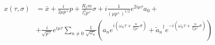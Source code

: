 \begin{equation}
\begin{aligned}
x(\tau,\sigma) &= \bar{x} + \frac{i}{2\mu p^+} p + \frac{R_1 m}{l_s^2 p^+} \sigma
               + i \frac{1}{(\mu p^+)^{1/2}} e^{2 i \mu \tau} a_0 + \\
 & + \frac{i}{\sqrt{p^+}} e^{i \mu \tau}
  \sum_{n \neq 0} \frac{1}{\sqrt{\omega_n}} 
  \left(
  a_n e^{i \left( \omega_n \tau + \frac{n}{l_s^2 p^+} \sigma \right)} +
  {\tilde{a}_n}^\dagger e^{-i \left( \omega_n \tau + \frac{n}{l_s^2 p^+}  \sigma \right)}
  \right) 
\end{aligned}                      
\end{equation}

